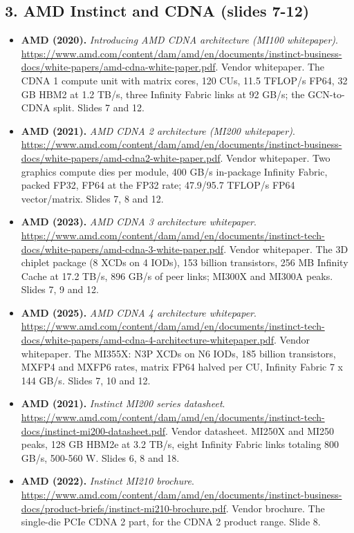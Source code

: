\subsection*{3. AMD Instinct and CDNA (slides 7-12)}
\begin{itemize}[leftmargin=1.2em,itemsep=3pt]\sloppy
\item \textbf{AMD (2020).} \textit{Introducing AMD CDNA architecture (MI100 whitepaper)}. \url{https://www.amd.com/content/dam/amd/en/documents/instinct-business-docs/white-papers/amd-cdna-white-paper.pdf}. Vendor whitepaper. The CDNA 1 compute unit with matrix cores, 120 CUs, 11.5 TFLOP/s FP64, 32 GB HBM2 at 1.2 TB/s, three Infinity Fabric links at 92 GB/s; the GCN-to-CDNA split. Slides 7 and 12.
\item \textbf{AMD (2021).} \textit{AMD CDNA 2 architecture (MI200 whitepaper)}. \url{https://www.amd.com/content/dam/amd/en/documents/instinct-business-docs/white-papers/amd-cdna2-white-paper.pdf}. Vendor whitepaper. Two graphics compute dies per module, 400 GB/s in-package Infinity Fabric, packed FP32, FP64 at the FP32 rate; 47.9/95.7 TFLOP/s FP64 vector/matrix. Slides 7, 8 and 12.
\item \textbf{AMD (2023).} \textit{AMD CDNA 3 architecture whitepaper}. \url{https://www.amd.com/content/dam/amd/en/documents/instinct-tech-docs/white-papers/amd-cdna-3-white-paper.pdf}. Vendor whitepaper. The 3D chiplet package (8 XCDs on 4 IODs), 153 billion transistors, 256 MB Infinity Cache at 17.2 TB/s, 896 GB/s of peer links; MI300X and MI300A peaks. Slides 7, 9 and 12.
\item \textbf{AMD (2025).} \textit{AMD CDNA 4 architecture whitepaper}. \url{https://www.amd.com/content/dam/amd/en/documents/instinct-tech-docs/white-papers/amd-cdna-4-architecture-whitepaper.pdf}. Vendor whitepaper. The MI355X: N3P XCDs on N6 IODs, 185 billion transistors, MXFP4 and MXFP6 rates, matrix FP64 halved per CU, Infinity Fabric 7 x 144 GB/s. Slides 7, 10 and 12.
\item \textbf{AMD (2021).} \textit{Instinct MI200 series datasheet}. \url{https://www.amd.com/content/dam/amd/en/documents/instinct-tech-docs/instinct-mi200-datasheet.pdf}. Vendor datasheet. MI250X and MI250 peaks, 128 GB HBM2e at 3.2 TB/s, eight Infinity Fabric links totaling 800 GB/s, 500-560 W. Slides 6, 8 and 18.
\item \textbf{AMD (2022).} \textit{Instinct MI210 brochure}. \url{https://www.amd.com/content/dam/amd/en/documents/instinct-business-docs/product-briefs/instinct-mi210-brochure.pdf}. Vendor brochure. The single-die PCIe CDNA 2 part, for the CDNA 2 product range. Slide 8.

\end{itemize}
